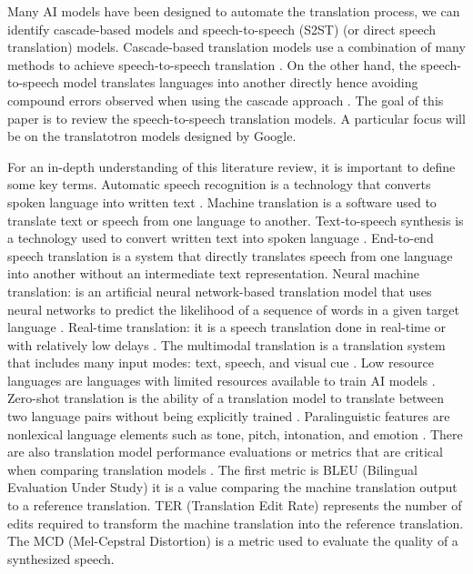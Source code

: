 \documentclass[12pt]{article}
\begin{document}
Many AI models have been designed to automate the translation process, we can identify cascade-based models and speech-to-speech (S2ST) (or direct speech translation) models.
Cascade-based translation models use a combination of many methods to achieve speech-to-speech translation \cite{cascade}. On the other hand, the speech-to-speech model translates languages into another directly hence avoiding compound errors observed when using the cascade approach \cite{jia}. The goal of this paper is to review the speech-to-speech translation models. A particular focus will be on the translatotron models designed by Google.

For an in-depth understanding of this literature review, it is important to define some key terms. Automatic speech recognition is a technology that converts spoken language into written text \cite{yu}. Machine translation is a software used to translate text or speech from one language to another\cite{koen}. Text-to-speech synthesis is a technology used to convert written text into spoken language \cite{dutoit}. End-to-end speech translation is a system that directly translates speech from one language into another without an intermediate text representation\cite{vila}. Neural machine translation: is an artificial neural network-based translation model that uses neural networks to predict the likelihood of a sequence of words in a given target language \cite{stah}. Real-time translation: it is a speech translation done in real-time or with relatively low delays \cite{abraham}. The multimodal translation is a translation system that includes many input modes: text, speech, and visual cue \cite{taylor}. Low resource languages are languages with limited resources available to train AI models \cite{cieri}. Zero-shot translation is the ability of a translation model to translate between two language pairs without being explicitly trained \cite{johnson}. Paralinguistic features are nonlexical language elements such as tone, pitch, intonation, and emotion \cite{crystal}. There are also translation model performance evaluations or metrics that are critical when comparing translation models \cite{son}. The first metric is BLEU (Bilingual Evaluation Under Study) it is a value comparing the machine translation output to a reference translation. TER (Translation Edit Rate) represents the number of edits required to transform the machine translation into the reference translation.   The MCD (Mel-Cepstral Distortion) is a metric used to evaluate the quality of a synthesized speech.
\end{document}
